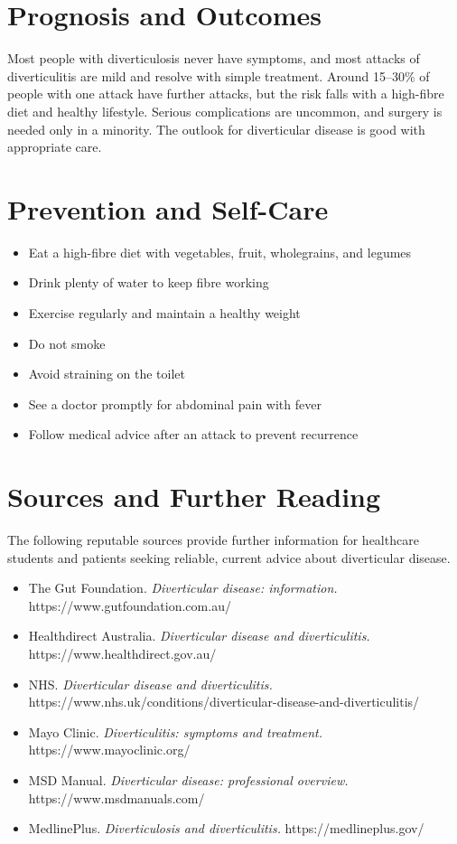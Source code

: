 \section*{Prognosis and Outcomes}
Most people with diverticulosis never have symptoms, and most attacks of diverticulitis are mild and resolve with simple treatment. Around 15--30\% of people with one attack have further attacks, but the risk falls with a high-fibre diet and healthy lifestyle. Serious complications are uncommon, and surgery is needed only in a minority. The outlook for diverticular disease is good with appropriate care.

\section*{Prevention and Self-Care}
\begin{itemize}
    \item Eat a high-fibre diet with vegetables, fruit, wholegrains, and legumes
    \item Drink plenty of water to keep fibre working
    \item Exercise regularly and maintain a healthy weight
    \item Do not smoke
    \item Avoid straining on the toilet
    \item See a doctor promptly for abdominal pain with fever
    \item Follow medical advice after an attack to prevent recurrence
\end{itemize}

\section*{Sources and Further Reading}
The following reputable sources provide further information for healthcare students and patients seeking reliable, current advice about diverticular disease.

\begin{itemize}
    \item The Gut Foundation. \textit{Diverticular disease: information.} https://www.gutfoundation.com.au/
    \item Healthdirect Australia. \textit{Diverticular disease and diverticulitis.} https://www.healthdirect.gov.au/
    \item NHS. \textit{Diverticular disease and diverticulitis.} https://www.nhs.uk/conditions/diverticular-disease-and-diverticulitis/
    \item Mayo Clinic. \textit{Diverticulitis: symptoms and treatment.} https://www.mayoclinic.org/
    \item MSD Manual. \textit{Diverticular disease: professional overview.} https://www.msdmanuals.com/
    \item MedlinePlus. \textit{Diverticulosis and diverticulitis.} https://medlineplus.gov/
\end{itemize}
